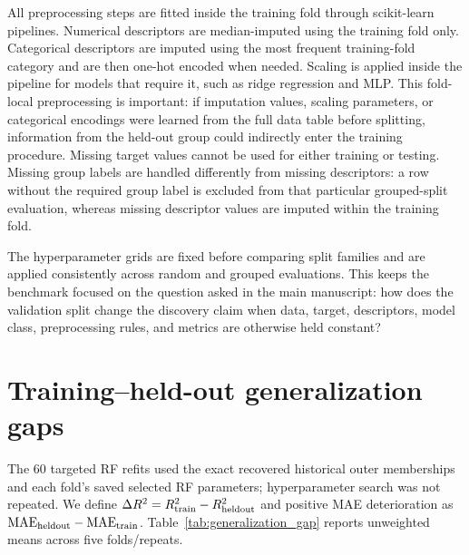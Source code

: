 \documentclass[11pt,a4paper]{article}
\begin{document}
All preprocessing steps are fitted inside the training fold through scikit-learn pipelines. Numerical descriptors are median-imputed using the training fold only. Categorical descriptors are imputed using the most frequent training-fold category and are then one-hot encoded when needed. Scaling is applied inside the pipeline for models that require it, such as ridge regression and MLP. This fold-local preprocessing is important: if imputation values, scaling parameters, or categorical encodings were learned from the full data table before splitting, information from the held-out group could indirectly enter the training procedure. Missing target values cannot be used for either training or testing. Missing group labels are handled differently from missing descriptors: a row without the required group label is excluded from that particular grouped-split evaluation, whereas missing descriptor values are imputed within the training fold.

The hyperparameter grids are fixed before comparing split families and are applied consistently across random and grouped evaluations. This keeps the benchmark focused on the question asked in the main manuscript: how does the validation split change the discovery claim when data, target, descriptors, model class, preprocessing rules, and metrics are otherwise held constant?

\section{Training--held-out generalization gaps}
The 60 targeted RF refits used the exact recovered historical outer memberships and each fold's saved selected RF parameters; hyperparameter search was not repeated. We define $\Delta R^2=R^2_{\rm train}-R^2_{\rm heldout}$ and positive MAE deterioration as $\mathrm{MAE}_{\rm heldout}-\mathrm{MAE}_{\rm train}$. Table~\ref{tab:generalization_gap} reports unweighted means across five folds/repeats.
\end{document}
